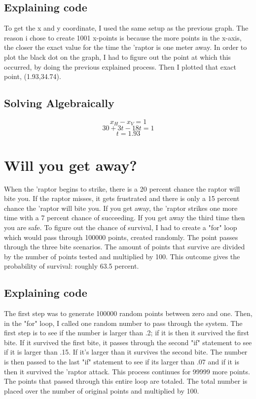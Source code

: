 \documentclass[twocolumn]{revtex4}
\begin{document}
\subsection{Explaining code}
To get the x and y coordinate, I used the same setup as the previous graph.  The reason i chose to create 1001 x-points is because the more points in the x-axis, the closer the exact value for the time the 'raptor is one meter away.  In order to plot the black dot on the graph, I had to figure out the point at which this occurred, by doing the previous explained process.  Then I plotted that exact point, (1.93,34.74).

\subsection{Solving Algebraically}
$$ x_H - x_V = 1 $$ 
$$ 30 + 3t - 18t = 1 $$ 
$$ t = 1.93 $$ 

\section{Will you get away?}
When the 'raptor begins to strike, there is a 20 percent chance the raptor will bite you.  If the raptor misses, it gets frustrated and there is only a 15 percent chance the 'raptor will bite you.  If you get away, the 'raptor strikes one more time with a 7 percent chance of succeeding.  If you get away the third time then you are safe.  To figure out the chance of survival, I had to create a "for" loop which would pass through 100000 points, created randomly.  The point passes through the three bite scenarios.  The amount of points that survive are divided by the number of points tested and multiplied by 100.  This outcome gives the probability of survival: roughly 63.5 percent.  

\subsection{Explaining code}
The first step was to generate 100000 random points between zero and one.  Then, in the "for" loop, I called one random number to pass through the system.  The first step is to see if the number is larger than .2; if it is then it survived the first bite.  If it survived the first bite, it passes through the second "if" statement to see if it is larger than .15.  If it's larger than it survives the second bite.  The number is then passed to the last "if" statement to see if its larger than .07 and if it is then it survived the 'raptor attack.  This process continues for 99999 more points.  The points that passed through this entire loop are totaled.  The total number is placed over the number of original points and multiplied by 100.  
\end{document}
